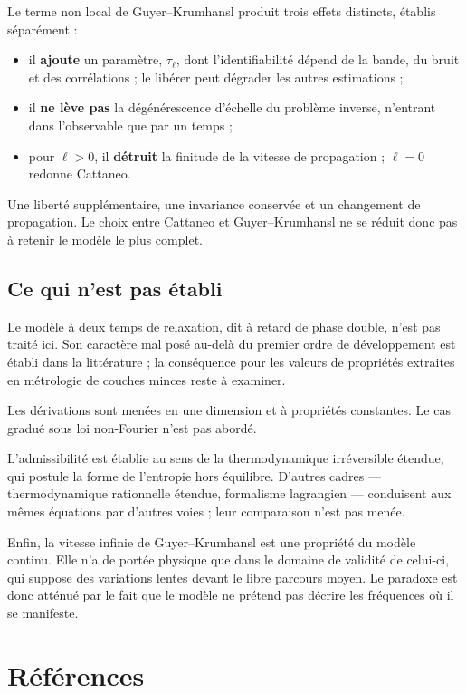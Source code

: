 \documentclass[11pt,a4paper]{article}
\begin{document}
Le terme non local de Guyer--Krumhansl produit trois effets distincts, établis séparément :

\begin{itemize}
\item il \textbf{ajoute} un paramètre, $\tau_\ell$, dont l'identifiabilité dépend
de la bande, du bruit et des corrélations ; le libérer peut dégrader les autres estimations ;
\item il \textbf{ne lève pas} la dégénérescence d'échelle du problème inverse, n'entrant dans
l'observable que par un temps ;
\item pour $\ell>0$, il \textbf{détruit} la finitude de la vitesse de propagation ; $\ell=0$ redonne Cattaneo.
\end{itemize}

Une liberté supplémentaire, une invariance conservée et un changement de propagation. Le choix entre Cattaneo
et Guyer--Krumhansl ne se réduit donc pas à retenir le modèle le plus complet.

\subsection{Ce qui n'est pas établi}

Le modèle à deux temps de relaxation, dit à retard de phase double, n'est pas traité ici. Son
caractère mal posé au-delà du premier ordre de développement est établi dans la littérature ; la
conséquence pour les valeurs de propriétés extraites en métrologie de couches minces reste à
examiner.

Les dérivations sont menées en une dimension et à propriétés constantes. Le cas gradué sous loi
non-Fourier n'est pas abordé.

L'admissibilité est établie au sens de la thermodynamique irréversible étendue, qui postule la forme
de l'entropie hors équilibre. D'autres cadres --- thermodynamique rationnelle étendue, formalisme
lagrangien --- conduisent aux mêmes équations par d'autres voies ; leur comparaison n'est pas menée.

Enfin, la vitesse infinie de Guyer--Krumhansl est une propriété du modèle continu. Elle n'a de portée
physique que dans le domaine de validité de celui-ci, qui suppose des variations lentes devant le
libre parcours moyen. Le paradoxe est donc atténué par le fait que le modèle ne prétend pas décrire
les fréquences où il se manifeste.

\section{Références}
\end{document}
